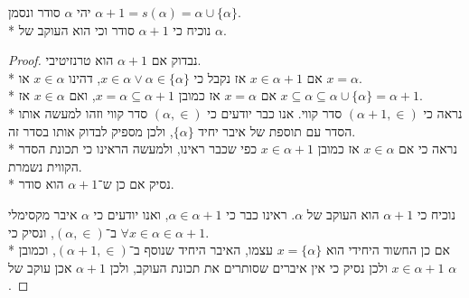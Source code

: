 \Question{}
יהי $\alpha$ סודר ונסמן $\alpha + 1 = s(\alpha) = \alpha \cup \{ \alpha \}$. \\*
נוכיח כי $\alpha + 1$ סודר וכי הוא העוקב של $\alpha$.
\begin{proof}
	נבדוק אם $\alpha + 1$ הוא טרנזיטיבי. \\*
	אם $x \in \alpha + 1$ אז נקבל כי $x \in \alpha \lor \alpha \in \{ \alpha \}$, דהינו $x \in \alpha$ או $x = \alpha$. \\*
	אם $x = \alpha$ אז כמובן $x = \alpha \subseteq \alpha + 1$, ואם $x \in \alpha$ אז $x \subseteq \alpha \subseteq \alpha \cup \{ \alpha \} = \alpha + 1$. \\*
	נראה כי $(\alpha + 1, \in)$ סדר קווי. אנו כבר יודעים כי $(\alpha, \in)$ סדר קווי וזהו למעשה אותו הסדר עם תוספת של איבר יחיד $\{ \alpha \}$, ולכן מספיק לבדוק אותו בסדר זה. \\*
	נראה כי אם $x \in \alpha$ אז כמובן $x \in \alpha + 1$ כפי שכבר ראינו, ולמעשה הראינו כי תכונת הסדר הקווית נשמרת. \\*
	נסיק אם כן ש־$\alpha + 1$ הוא סודר.

	נוכיח כי $\alpha + 1$ הוא העוקב של $\alpha$.
	ראינו כבר כי $\alpha \in \alpha + 1$, ואנו יודעים כי $\alpha$ איבר מקסימלי ב־$(\alpha, \in)$, ונסיק כי $\forall x \in \alpha \in \alpha + 1$. \\*
	אם כן החשוד היחידי הוא $x = \{ \alpha \}$ עצמו, האיבר היחיד שנוסף ב־$(\alpha + 1, \in)$, וכמובן $x \in \alpha + 1$ ולכן נסיק כי אין איברים שסותרים את תכונת העוקב, ולכן $\alpha + 1$ אכן עוקב של $\alpha$.
\end{proof}

